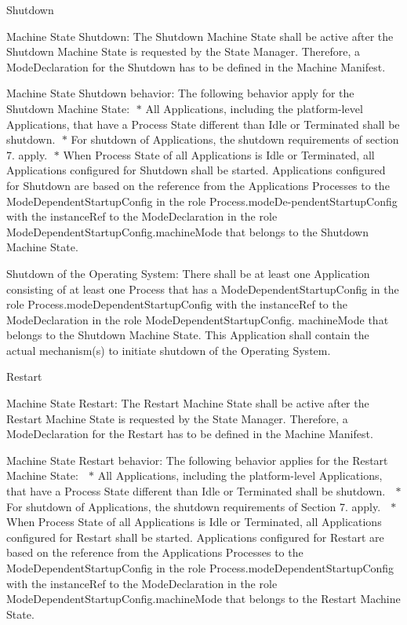\begin{DoxyItemize}
\begin{DoxyItemize}
\begin{DoxyItemize}
\begin{DoxyItemize}
\end{DoxyItemize}
\item Shutdown
\begin{DoxyItemize}
\item Machine State Shutdown\+: The Shutdown Machine State shall be active after the Shutdown Machine State is requested by the State Manager. Therefore, a Mode\+Declaration for the Shutdown has to be defined in the Machine Manifest.
\item Machine State Shutdown behavior\+: The following behavior apply for the Shutdown Machine State\+: $\ast$ All Applications, including the platform-\/level Applications, that have a Process State different than Idle or Terminated shall be shutdown. $\ast$ For shutdown of Applications, the shutdown requirements of section 7. apply. $\ast$ When Process State of all Applications is Idle or Terminated, all Applications configured for Shutdown shall be started. Applications configured for Shutdown are based on the reference from the Applications Processes to the Mode\+Dependent\+Startup\+Config in the role Process.\+mode\+De-\/pendent\+Startup\+Config with the instance\+Ref to the Mode\+Declaration in the role Mode\+Dependent\+Startup\+Config.\+machine\+Mode that belongs to the Shutdown Machine State.
\item Shutdown of the Operating System\+: There shall be at least one Application consisting of at least one Process that has a Mode\+Dependent\+Startup\+Config in the role Process.\+mode\+Dependent\+Startup\+Config with the instance\+Ref to the Mode\+Declaration in the role Mode\+Dependent\+Startup\+Config. machine\+Mode that belongs to the Shutdown Machine State. This Application shall contain the actual mechanism(s) to initiate shutdown of the Operating System.
\end{DoxyItemize}
\item Restart
\begin{DoxyItemize}
\item Machine State Restart\+: The Restart Machine State shall be active after the Restart Machine State is requested by the State Manager. Therefore, a Mode\+Declaration for the Restart has to be defined in the Machine Manifest.
\item Machine State Restart behavior\+: The following behavior applies for the Restart Machine State\+:  $\ast$ All Applications, including the platform-\/level Applications, that have a Process State different than Idle or Terminated shall be shutdown.  $\ast$ For shutdown of Applications, the shutdown requirements of Section 7. apply.  $\ast$ When Process State of all Applications is Idle or Terminated, all Applications configured for Restart shall be started. Applications configured for Restart are based on the reference from the Applications Processes to the Mode\+Dependent\+Startup\+Config in the role Process.\+mode\+Dependent\+Startup\+Config with the instance\+Ref to the Mode\+Declaration in the role Mode\+Dependent\+Startup\+Config.\+machine\+Mode that belongs to the Restart Machine State.

\end{DoxyItemize}
\end{DoxyItemize}
\end{DoxyItemize}
\end{DoxyItemize}
